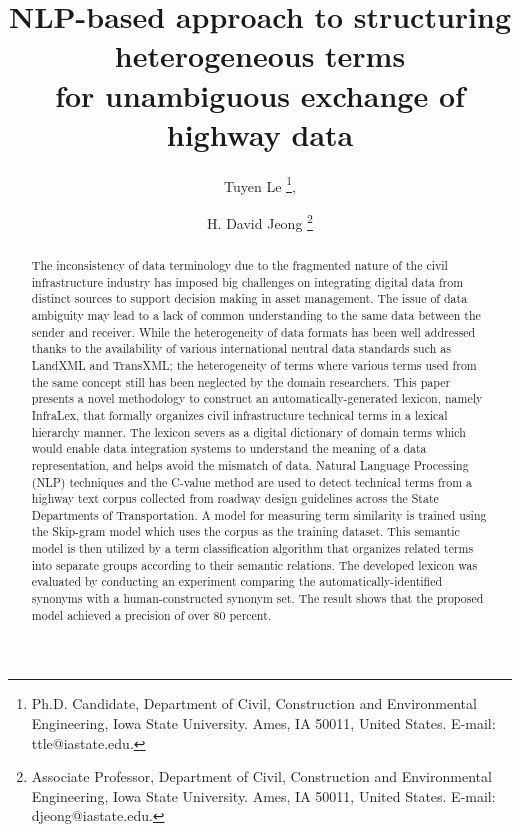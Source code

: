 \documentclass[Journal, BackFigs, DoubleSpace]{ascelike} %
\begin{document}
\title{NLP-based approach to structuring heterogeneous terms \\for unambiguous exchange of highway data}


%
\author{
Tuyen Le
\thanks{
Ph.D. Candidate, Department of Civil, Construction and Environmental Engineering, Iowa State University. Ames, IA 50011, United States. E-mail: ttle@iastate.edu.},
\and
H. David Jeong
\thanks{Associate Professor, Department of Civil, Construction and Environmental Engineering, Iowa State University. Ames, IA 50011, United States. E-mail: djeong@iastate.edu.}
 }

\maketitle
%

\begin{abstract} %
The inconsistency of data terminology due to the fragmented nature of the civil infrastructure industry has imposed big challenges on integrating digital data from distinct sources to support decision making in asset management. The issue of data ambiguity may lead to a lack of common understanding to the same data between the sender and receiver. While the heterogeneity of data formats has been well addressed thanks to the availability of various international neutral data standards such as LandXML and TransXML;  the heterogeneity of terms where various terms used from the same concept still has been neglected by the domain researchers. 
This paper presents a novel methodology to construct an automatically-generated lexicon, namely InfraLex, that formally organizes civil infrastructure technical terms in a lexical hierarchy manner. The lexicon severs as a digital dictionary of domain terms which would enable data integration systems to understand the meaning of a data representation, and helps avoid the mismatch of data.
Natural Language Processing (NLP) techniques and the C-value method are used to detect technical terms from a highway text corpus collected from roadway design guidelines across the State Departments of Transportation. A model for measuring term similarity is trained using the Skip-gram model which uses the corpus as the training dataset. This semantic model is then utilized by a term classification algorithm that organizes related terms into separate groups according to their semantic relations.
The developed lexicon was evaluated by conducting an experiment comparing the automatically-identified synonyms with a human-constructed synonym set. The result shows that the proposed model achieved a precision of over 80 percent.
  
\end{abstract}
\end{document}
